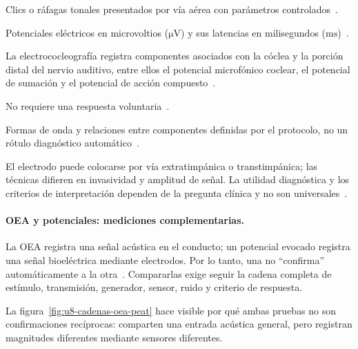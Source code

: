 \begin{description}[style=nextline]
    \item[Estímulo.]
    Clics o ráfagas tonales presentados por vía aérea con parámetros
    controlados~\cite{skinnerGlattke1977,ashaHearingAdults}.

    \item[Magnitud registrada.]
    Potenciales eléctricos en microvoltios (\(\mathrm{\mu V}\)) y sus
    latencias en milisegundos (\(\mathrm{ms}\))~\cite{simpson2020}.

    \item[Parte del sistema evaluada.]
    La electrococleografía registra componentes asociados con la
    cóclea y la porción distal del nervio auditivo, entre ellos el potencial
    microfónico coclear, el potencial de sumación y el potencial de acción
    compuesto~\cite{simpson2020}.

    \item[Respuesta conductual.]
    No requiere una respuesta voluntaria~\cite{simpson2020}.

    \item[Resultado básico esperado.]
    Formas de onda y relaciones entre componentes definidas por el
    protocolo, no un rótulo diagnóstico automático~\cite{simpson2020}.

    \item[Limitaciones generales.]
    El electrodo puede colocarse por vía extratimpánica o
    transtimpánica; las técnicas difieren en invasividad y amplitud de señal.
    La utilidad diagnóstica y los criterios de interpretación dependen de la
    pregunta clínica y no son universales~\cite{simpson2020}.
\end{description}

\paragraph{OEA y potenciales: mediciones complementarias.}
La OEA registra una señal acústica en el conducto; un potencial evocado
registra una señal bioeléctrica mediante electrodos. Por lo tanto, una no
``confirma'' automáticamente a la otra~\cite{simpson2020}. Compararlas exige seguir la cadena
completa de estímulo, transmisión, generador, sensor, ruido y criterio de respuesta.

La figura~\ref{fig:u8-cadenas-oea-peat} hace visible por qué ambas pruebas no
son confirmaciones recíprocas: comparten una entrada acústica general, pero
registran magnitudes diferentes mediante sensores diferentes.

